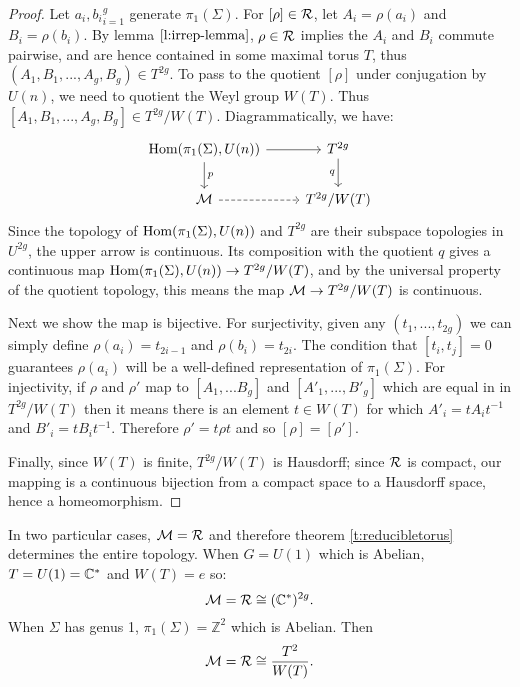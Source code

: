 	\begin{proof}
		Let ${a_i,b_i}_{i=1}^{g}$ generate $\pi_1(\Sigma)$. For $[\rho]\in \mathcal{R}$, let $A_i = \rho(a_i)$ and $B_i = \rho(b_i)$. By lemma $\ref{l:irrep-lemma}$, $\rho\in \mathcal{R}$ implies the $A_i$ and $B_i$ commute pairwise, and are hence contained in some maximal torus $T$, thus $(A_1,B_1,...,A_g,B_g)\in T^{2g}$. To pass to the quotient $[\rho]$ under conjugation by $U(n)$, we need to quotient the Weyl group $W(T)$. Thus $[A_1,B_1,...,A_g,B_g] \in T^{2g}/W(T)$. Diagrammatically, we have:
		\[\begin{tikzcd}
		{\Hom(\pi_1(\Sigma),U(n))} & {T^{2g}} \\
		\MM & {T^{2g}/W(T)}
		\arrow["p", from=1-1, to=2-1]
		\arrow[from=1-1, to=1-2]
		\arrow["q"', from=1-2, to=2-2]
		\arrow[dashed, from=2-1, to=2-2]
		\end{tikzcd}\]
		Since the topology of $\text{Hom}(\pi_1(\Sigma),U(n))$ and $T^{2g}$ are their subspace topologies in $U^{2g}$, the upper arrow is continuous. Its composition with the quotient $q$ gives a continuous map $\text{Hom}(\pi_1(\Sigma), U(n))\to T^{2g}/W(T)$, and by the universal property of the quotient topology, this means the map $\mathcal{M}\to T^{2g}/W(T)$ is continuous.
		
		Next we show the map is bijective. For surjectivity, given any $(t_1,...,t_{2g})$ we can simply define $\rho(a_i) = t_{2i-1}$ and $\rho(b_i) = t_{2i}$. The condition that $[t_i,t_j]=0$ guarantees $\rho(a_i)$ will be a well-defined representation of $\pi_1(\Sigma)$. For injectivity, if $\rho$ and $\rho'$ map to $[A_1,...B_g]$ and $[A'_1,...,B'_g]$ which are equal in in $T^{2g}/W(T)$ then it means there is an element $t\in W(T)$ for which $A'_i = tA_it^{-1}$ and $B'_i = tB_i t^{-1}$. Therefore $\rho' = t\rho t$ and so $[\rho]=[\rho']$.
		
		Finally, since $W(T)$ is finite, $T^{2g}/W(T)$ is Hausdorff; since $\mathcal{R}$ is compact, our mapping is a continuous bijection from a compact space to a Hausdorff space, hence a homeomorphism.
	\end{proof}
	In two particular cases, $\mathcal{M} = \mathcal{R}$ and therefore theorem \ref{t:reducibletorus} determines the entire topology. When $G=U(1)$ which is Abelian, $T = U(1) = \mathbb{C}^{\ast}$ and $W(T) = {e}$ so:
	\begin{equation}
		\mathcal{M} = \mathcal{R} \cong (\mathbb{C}^{\ast})^{2g}.
	\end{equation}
	When $\Sigma$ has genus 1, $\pi_1(\Sigma) = \mathbb{Z}^2$ which is Abelian. Then
	\begin{equation}
		\mathcal{M} = \mathcal{R} \cong \frac{T^{2}}{W(T)}.
	\end{equation}
